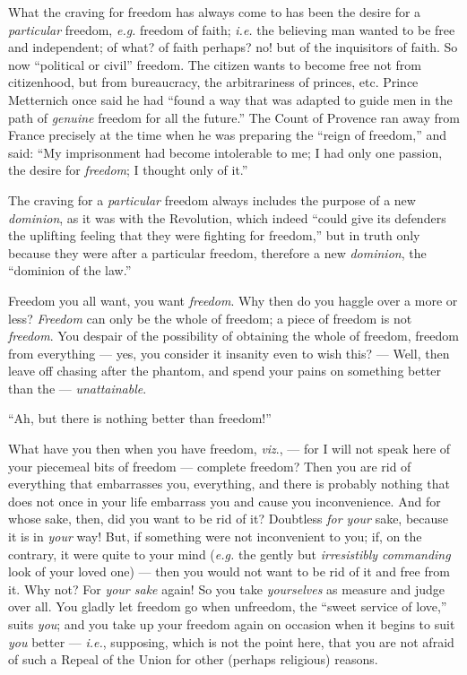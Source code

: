 What the craving for freedom has always come to has been the desire for a 
\textit{particular} freedom, \textit{e.g.} freedom of faith; \textit{i.e.} 
the believing man wanted to be free and independent; of what? of faith 
perhaps? no! but of the inquisitors of faith. So now ``political or civil'' 
freedom. The citizen wants to become free not from citizenhood, but from 
bureaucracy, the arbitrariness of princes, etc. Prince Metternich once said he 
had ``found a way that was adapted to guide men in the path of 
\textit{genuine} freedom for all the future.'' The Count of Provence ran away 
from France precisely at the time when he was preparing the ``reign of 
freedom,'' and said: ``My imprisonment had become intolerable to me; I had 
only one passion, the desire for \textit{freedom}; I thought only of it.''

The craving for a \textit{particular} freedom always includes the purpose of a 
new \textit{dominion}, as it was with the Revolution, which indeed ``could 
give its defenders the uplifting feeling that they were fighting for 
freedom,'' but in truth only because they were after a particular freedom, 
therefore a new \textit{dominion}, the ``dominion of the law.''

Freedom you all want, you want \textit{freedom}. Why then do you haggle over a 
more or less? \textit{Freedom} can only be the whole of freedom; a piece of 
freedom is not \textit{freedom}. You despair of the possibility of obtaining 
the whole of freedom, freedom from everything --- yes, you consider it insanity 
even to wish this? --- Well, then leave off chasing after the phantom, and 
spend your pains on something better than the --- \textit{unattainable}.

``Ah, but there is nothing better than freedom!''

What have you then when you have freedom, \textit{viz}., --- for I will not 
speak here of your piecemeal bits of freedom --- complete freedom? Then you are 
rid of everything that embarrasses you, everything, and there is probably 
nothing that does not once in your life embarrass you and cause you 
inconvenience. And for whose sake, then, did you want to be rid of it? 
Doubtless \textit{for your} sake, because it is in \textit{your} way! But, if 
something were not inconvenient to you; if, on the contrary, it were quite to 
your mind (\textit{e.g.} the gently but \textit{irresistibly commanding} look 
of your loved one) --- then you would not want to be rid of it and free from 
it. Why not? For \textit{your sake} again! So you take \textit{yourselves} as 
measure and judge over all. You gladly let freedom go when unfreedom, the 
``sweet service of love,'' suits \textit{you}; and you take up your freedom 
again on occasion when it begins to suit \textit{you} better --- \textit{i.e.}, 
supposing, which is not the point here, that you are not afraid of such a 
Repeal of the Union for other (perhaps religious) reasons.

